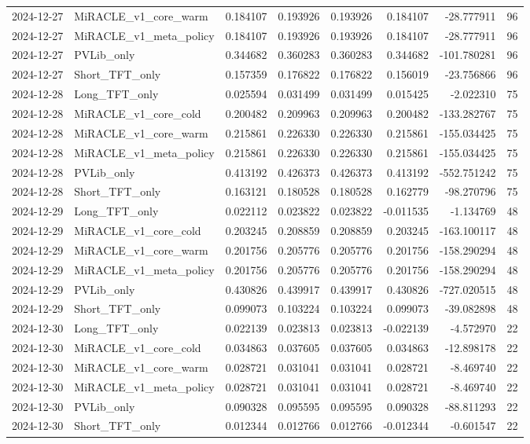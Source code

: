 \begin{tabular}{llrrrrrr}
2024-12-27 & MiRACLE_v1_core_warm & 0.184107 & 0.193926 & 0.193926 & 0.184107 & -28.777911 & 96 \\
2024-12-27 & MiRACLE_v1_meta_policy & 0.184107 & 0.193926 & 0.193926 & 0.184107 & -28.777911 & 96 \\
2024-12-27 & PVLib_only & 0.344682 & 0.360283 & 0.360283 & 0.344682 & -101.780281 & 96 \\
2024-12-27 & Short_TFT_only & 0.157359 & 0.176822 & 0.176822 & 0.156019 & -23.756866 & 96 \\
2024-12-28 & Long_TFT_only & 0.025594 & 0.031499 & 0.031499 & 0.015425 & -2.022310 & 75 \\
2024-12-28 & MiRACLE_v1_core_cold & 0.200482 & 0.209963 & 0.209963 & 0.200482 & -133.282767 & 75 \\
2024-12-28 & MiRACLE_v1_core_warm & 0.215861 & 0.226330 & 0.226330 & 0.215861 & -155.034425 & 75 \\
2024-12-28 & MiRACLE_v1_meta_policy & 0.215861 & 0.226330 & 0.226330 & 0.215861 & -155.034425 & 75 \\
2024-12-28 & PVLib_only & 0.413192 & 0.426373 & 0.426373 & 0.413192 & -552.751242 & 75 \\
2024-12-28 & Short_TFT_only & 0.163121 & 0.180528 & 0.180528 & 0.162779 & -98.270796 & 75 \\
2024-12-29 & Long_TFT_only & 0.022112 & 0.023822 & 0.023822 & -0.011535 & -1.134769 & 48 \\
2024-12-29 & MiRACLE_v1_core_cold & 0.203245 & 0.208859 & 0.208859 & 0.203245 & -163.100117 & 48 \\
2024-12-29 & MiRACLE_v1_core_warm & 0.201756 & 0.205776 & 0.205776 & 0.201756 & -158.290294 & 48 \\
2024-12-29 & MiRACLE_v1_meta_policy & 0.201756 & 0.205776 & 0.205776 & 0.201756 & -158.290294 & 48 \\
2024-12-29 & PVLib_only & 0.430826 & 0.439917 & 0.439917 & 0.430826 & -727.020515 & 48 \\
2024-12-29 & Short_TFT_only & 0.099073 & 0.103224 & 0.103224 & 0.099073 & -39.082898 & 48 \\
2024-12-30 & Long_TFT_only & 0.022139 & 0.023813 & 0.023813 & -0.022139 & -4.572970 & 22 \\
2024-12-30 & MiRACLE_v1_core_cold & 0.034863 & 0.037605 & 0.037605 & 0.034863 & -12.898178 & 22 \\
2024-12-30 & MiRACLE_v1_core_warm & 0.028721 & 0.031041 & 0.031041 & 0.028721 & -8.469740 & 22 \\
2024-12-30 & MiRACLE_v1_meta_policy & 0.028721 & 0.031041 & 0.031041 & 0.028721 & -8.469740 & 22 \\
2024-12-30 & PVLib_only & 0.090328 & 0.095595 & 0.095595 & 0.090328 & -88.811293 & 22 \\
2024-12-30 & Short_TFT_only & 0.012344 & 0.012766 & 0.012766 & -0.012344 & -0.601547 & 22 \\
\bottomrule
\end{tabular}

